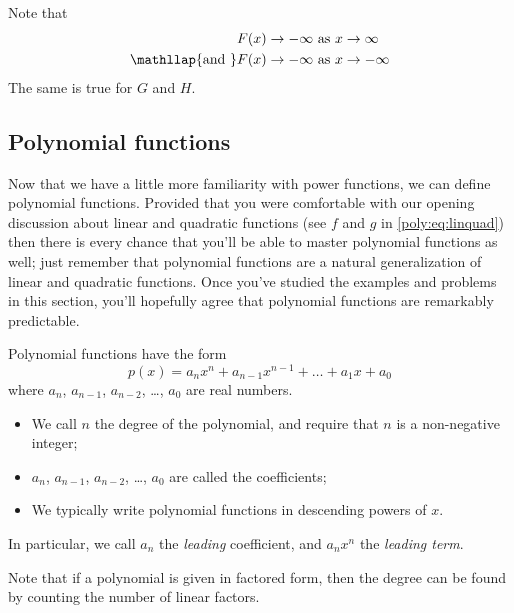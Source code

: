 \begin{doyouunderstand}
\begin{problem}
\begin{subproblem}
\begin{shortsolution}
				 Note that
				 \begin{align*}
					 F(x)\rightarrow-\infty                          & \text{ as } x\rightarrow\infty  \\
					 \mathllap{\text{and }}   F(x)\rightarrow-\infty & \text{ as } x\rightarrow-\infty
				 \end{align*}
				 The same is true for $G$ and $H$.
			 \end{shortsolution}
		 \end{subproblem}
		 \end{problem}
	 \end{doyouunderstand}

 \subsection*{Polynomial functions}
	 Now that we have a little more familiarity with power functions,
	 we can define polynomial functions. Provided that you were comfortable
	 with our opening discussion about linear and quadratic functions (see
	 $f$ and $g$ in \cref{poly:eq:linquad}) then there is every chance
	 that you'll be able to master polynomial functions as well; just remember
	 that polynomial functions are a natural generalization of linear
	 and quadratic functions. Once you've studied the examples and problems
	 in this section, you'll hopefully agree that polynomial functions
	 are remarkably predictable.

	 \begin{pccdefinition}
		 Polynomial functions have the form
		 \[
			 p(x)=a_nx^n+a_{n-1}x^{n-1}+\ldots+a_1x+a_0
		 \]
		 where $a_n$, $a_{n-1}$, $a_{n-2}$, \ldots, $a_0$ are real numbers.
		 \begin{itemize}
			 \item We call $n$ the degree of the polynomial, and require that $n$
			       is a non-negative integer;
			 \item $a_n$, $a_{n-1}$, $a_{n-2}$, \ldots, $a_0$ are called the coefficients;
			 \item We typically write polynomial functions in descending powers of $x$.
		 \end{itemize}
		 In particular, we call $a_n$ the \emph{leading} coefficient, and $a_nx^n$ the
		 \emph{leading term}.

		 Note that if a polynomial is given in factored form, then the degree can be found
		 by counting the number of linear factors.
	 \end{pccdefinition}

